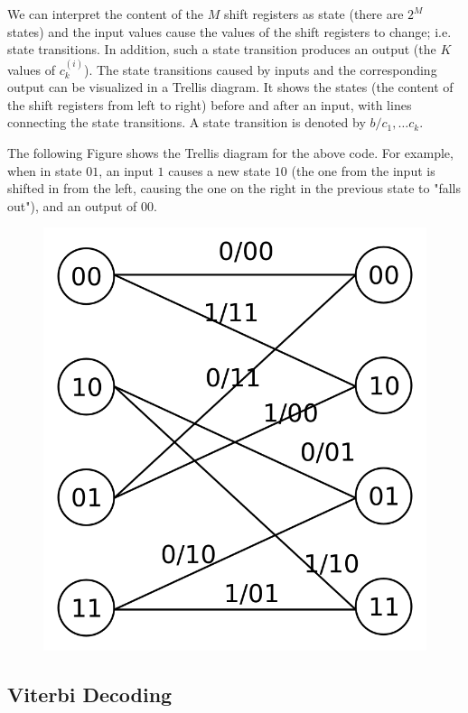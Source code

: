 We can interpret the content of the $M$ shift registers as state (there are $2^M$ states) and the input values cause the values of the shift registers to change; i.e. state transitions. In addition, such a state transition produces an output (the $K$ values of $c_k^{(i)}$). The state transitions caused by inputs and the corresponding output can be visualized in a Trellis diagram. It shows the states (the content of the shift registers from left to right) before and after an input, with lines connecting the state transitions. A state transition is denoted by $b/c_1,\ldots c_k$.

The following Figure shows the Trellis diagram for the above code. For example, when in state $01$, an input $1$ causes a new state $10$ (the one from the input is shifted in from the left, causing the one on the right in the previous state to "falls out"), and an output of $00$.

\begin{figure}[h]
  \includegraphics[scale=1.2]{images/convcodes_1_2.png}
\end{figure}



\subsection{Viterbi Decoding}

